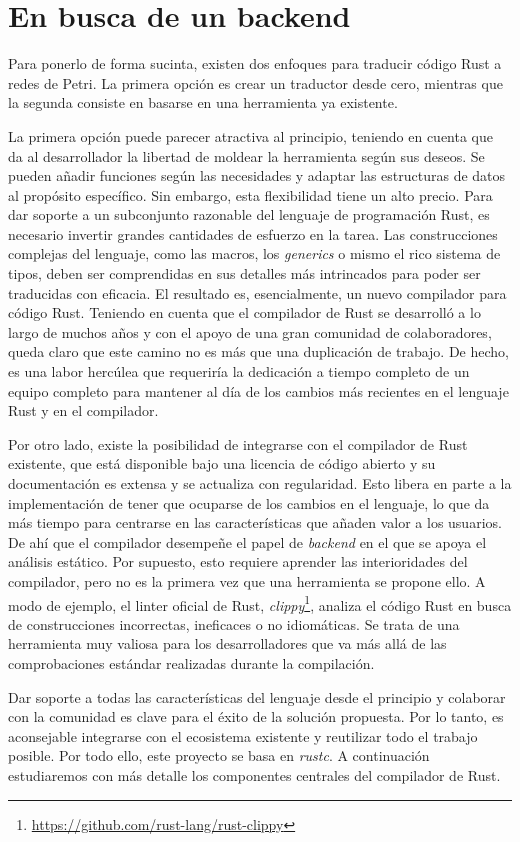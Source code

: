\section{En busca de un backend}

Para ponerlo de forma sucinta, existen dos enfoques para traducir código Rust a redes de Petri. La primera
opción es crear un traductor desde cero, mientras que la segunda consiste en basarse en una
herramienta ya existente.

La primera opción puede parecer atractiva al principio, teniendo en cuenta que da al
desarrollador la libertad de moldear la herramienta según sus deseos. Se pueden añadir
funciones según las necesidades y adaptar las estructuras de datos al propósito específico. Sin
embargo, esta flexibilidad tiene un alto precio. Para dar soporte a un subconjunto razonable del
lenguaje de programación Rust, es necesario invertir grandes cantidades de esfuerzo en la tarea.
Las construcciones complejas del lenguaje, como las macros, los \textit{generics} o mismo el rico sistema
de tipos, deben ser comprendidas en sus detalles más intrincados para poder ser
traducidas con eficacia. El resultado es, esencialmente, un nuevo compilador para código Rust.
Teniendo en cuenta que el compilador de Rust se desarrolló a lo largo de muchos años y con el
apoyo de una gran comunidad de colaboradores, queda claro que este camino no es más que
una duplicación de trabajo. De hecho, es una labor hercúlea que requeriría la dedicación a
tiempo completo de un equipo completo para mantener al día de los cambios más recientes en el lenguaje Rust y
en el compilador.

Por otro lado, existe la posibilidad de integrarse con el compilador de Rust existente, que está
disponible bajo una licencia de código abierto y su documentación es extensa y se actualiza con
regularidad. Esto libera en parte a la implementación de tener que ocuparse de los cambios en
el lenguaje, lo que da más tiempo para centrarse en las características que añaden valor a los
usuarios. De ahí que el compilador desempeñe el papel de \emph{backend} en el que se apoya el
análisis estático. Por supuesto, esto requiere aprender las interioridades del compilador, pero no
es la primera vez que una herramienta se propone ello. A modo de ejemplo, el linter oficial de Rust,
\emph{clippy}\footnote{\url{https://github.com/rust-lang/rust-clippy}},
analiza el código Rust en busca de construcciones incorrectas, ineficaces o no
idiomáticas. Se trata de una herramienta muy valiosa para los desarrolladores que va más allá
de las comprobaciones estándar realizadas durante la compilación.

Dar soporte a todas las características del lenguaje desde el principio y colaborar con la comunidad es
clave para el éxito de la solución propuesta. Por lo tanto, es aconsejable integrarse con el
ecosistema existente y reutilizar todo el trabajo posible. Por todo ello, este proyecto se basa en
\emph{rustc}. A continuación estudiaremos con más detalle los componentes centrales del compilador de
Rust.
